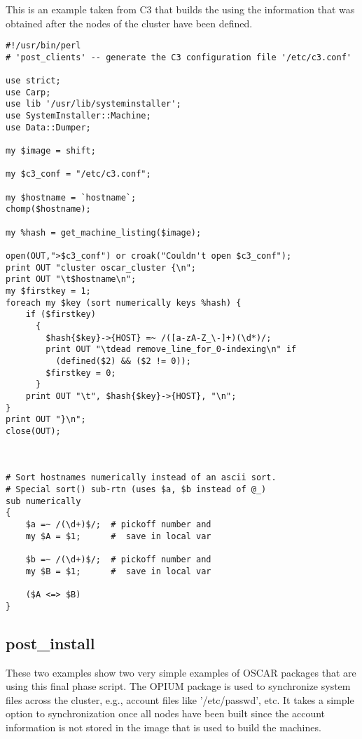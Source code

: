 This is an example taken from C3 that builds the  using
the information that was obtained after the nodes of the cluster have been
defined. 
\begin{scriptsize}
\begin{verbatim}
#!/usr/bin/perl
# 'post_clients' -- generate the C3 configuration file '/etc/c3.conf'

use strict;
use Carp;
use lib '/usr/lib/systeminstaller';
use SystemInstaller::Machine;
use Data::Dumper;

my $image = shift;

my $c3_conf = "/etc/c3.conf";

my $hostname = `hostname`;
chomp($hostname);

my %hash = get_machine_listing($image);

open(OUT,">$c3_conf") or croak("Couldn't open $c3_conf");
print OUT "cluster oscar_cluster {\n";
print OUT "\t$hostname\n";
my $firstkey = 1;
foreach my $key (sort numerically keys %hash) {
    if ($firstkey)
      {
        $hash{$key}->{HOST} =~ /([a-zA-Z_\-]+)(\d*)/;
        print OUT "\tdead remove_line_for_0-indexing\n" if 
          (defined($2) && ($2 != 0));
        $firstkey = 0;
      }
    print OUT "\t", $hash{$key}->{HOST}, "\n";
}
print OUT "}\n";
close(OUT);



# Sort hostnames numerically instead of an ascii sort.
# Special sort() sub-rtn (uses $a, $b instead of @_)
sub numerically
{
    $a =~ /(\d+)$/;  # pickoff number and
    my $A = $1;      #  save in local var

    $b =~ /(\d+)$/;  # pickoff number and
    my $B = $1;      #  save in local var

    ($A <=> $B)
}
\end{verbatim}
\end{scriptsize}


\subsection{post\_install}

These two examples show two very simple examples of OSCAR packages that are
using this final phase script.  The OPIUM package is used to synchronize
system files across the cluster, e.g., account files like '/etc/passwd',
etc.  It takes a simple option to  synchronization once all
nodes have been built since the account information is not stored in the
image that is used to build the machines.

